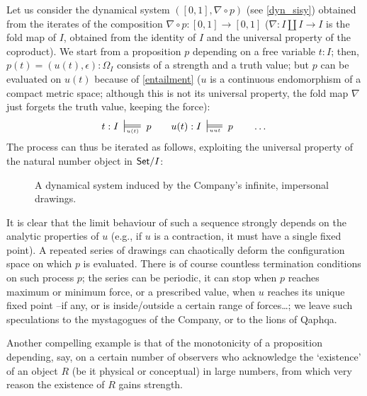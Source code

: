 \begin{example}
  Let us consider the dynamical system $([0,1],\nabla\circ p)$ (see \autoref{dyn_sisy}) obtained from the iterates of the composition $\nabla \circ p : [0,1] \to [0,1]$ ($\nabla : I\amalg I \to I$ is the fold map of $I$, obtained from the identity of $I$ and the universal property of the coproduct). We start from a proposition $p$ depending on a free variable $t : I$; then, $p(t) = (u(t),\epsilon): \Omega_I$ consists of a strength and a truth value; but $p$ can be evaluated on $u(t)$ because of \eqref{entailment} ($u$ is a continuous endomorphism of a compact metric space; although this is not its universal property, the fold map $\nabla$ just forgets the truth value, keeping the force):
  \[
    t : I\entails{u(t)} p \qquad u(t) :I \entails{uut} p \qquad \dots
  \]
  The process can thus be iterated as follows, exploiting the universal property of the natural number object in $\mathsf{Set}/I$:
  \begin{center}
    \begin{figure}[h]
      \def\line{\draw (0,0) -- (1,0); \draw (0,.5) -- (1,.5);}
      \caption{A dynamical system induced by the Company's infinite, impersonal drawings.}
      \label{fig_dynamics}
    \end{figure}
  \end{center}
  It is clear that the limit behaviour of such a sequence strongly depends on the analytic properties of $u$ (e.g., if $u$ is a contraction, it must have a single fixed point). A repeated series of drawings can chaotically deform the configuration space on which $p$ is evaluated. There is of course countless termination conditions on such process $p$; the series can be periodic, it can stop when $p$ reaches maximum or minimum force, or a prescribed value, when $u$ reaches its unique fixed point --if any, or is inside/outside a certain range of forces\dots; we leave such speculations to the mystagogues of the Company, or to the lions of Qaphqa.
\end{example}
Another compelling example is that of the monotonicity of a proposition depending, say, on a certain number of observers who acknowledge the `existence' of an object $R$ (be it physical or conceptual) in large numbers, from which very reason the existence of $R$ gains strength.
